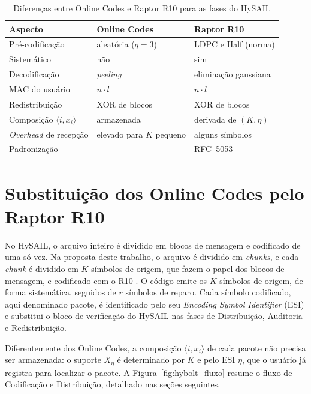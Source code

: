 \begin{table}[htbp]
	\centering
	\caption{Diferenças entre Online Codes e Raptor R10 para as fases do HySAIL}
	\label{tab:escolha_codigo}
	\footnotesize
	\begin{tabular}{@{}lll@{}}
		\hline
		\textbf{Aspecto} & \textbf{Online Codes} & \textbf{Raptor R10} \\
		\hline
		Pré-codificação & aleatória ($q = 3$) & LDPC e Half (norma) \\
		Sistemático & não & sim \\
		Decodificação & \emph{peeling} & eliminação gaussiana \\
		\acrshort{MAC} do usuário & $n \cdot l$ & $n \cdot l$ \\
		Redistribuição & XOR de blocos & XOR de blocos \\
		Composição $\langle i, x_i \rangle$ & armazenada & derivada de $(K, \eta)$ \\
		\emph{Overhead} de recepção & elevado para $K$ pequeno & alguns símbolos \\
		Padronização & -- & RFC~5053 \\
		\hline
	\end{tabular}
\end{table}

\section{Substituição dos Online Codes pelo Raptor R10}

No HySAIL, o arquivo inteiro é dividido em blocos de mensagem e codificado de uma só vez. Na proposta deste trabalho, o arquivo é dividido em \emph{chunks}, e cada \emph{chunk} é dividido em $K$ símbolos de origem, que fazem o papel dos blocos de mensagem, e codificado com o R10 \cite{luby2007rfc5053}. O código emite os $K$ símbolos de origem, de forma sistemática, seguidos de $r$ símbolos de reparo. Cada símbolo codificado, aqui denominado pacote, é identificado pelo seu \emph{Encoding Symbol Identifier} (\acrshort{ESI}) e substitui o bloco de verificação do HySAIL nas fases de Distribuição, Auditoria e Redistribuição.

Diferentemente dos Online Codes, a composição $\langle i, x_i \rangle$ de cada pacote não precisa ser armazenada: o suporte $X_\eta$ é determinado por $K$ e pelo \acrshort{ESI} $\eta$, que o usuário já registra para localizar o pacote. A Figura~\ref{fig:hybolt_fluxo} resume o fluxo de Codificação e Distribuição, detalhado nas seções seguintes.

